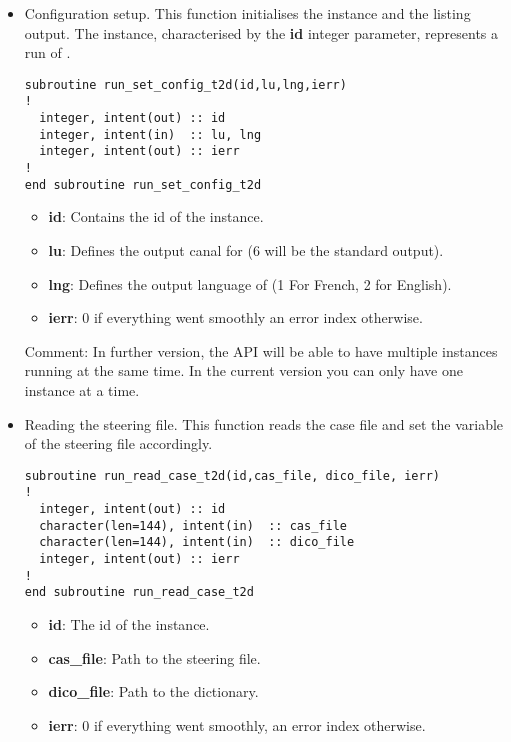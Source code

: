 \begin{itemize}
\item Configuration setup. This function initialises the instance and the
  listing output. The instance, characterised by the \textbf{id} integer parameter,
  represents a run of .

\begin{lstlisting}
subroutine run_set_config_t2d(id,lu,lng,ierr)
!
  integer, intent(out) :: id
  integer, intent(in)  :: lu, lng
  integer, intent(out) :: ierr
!
end subroutine run_set_config_t2d
\end{lstlisting}

\begin{itemize}
\item \textbf{id}: Contains the id of the instance.
\item \textbf{lu}: Defines the output canal for  (6 will be the
  standard output).
\item \textbf{lng}: Defines the output language of  (1 For French,
  2 for English).
\item \textbf{ierr}: 0 if everything went smoothly an error index otherwise.
\end{itemize}

\begin{CommentBlock}{Comment:}
\centering
In further version, the API will be able to have multiple instances running at
the same time. In the current version you can only have one instance at a time.
\end{CommentBlock}

\item Reading the  steering file. This function reads the case file and
  set the variable of the  steering file accordingly.

\begin{lstlisting}
subroutine run_read_case_t2d(id,cas_file, dico_file, ierr)
!
  integer, intent(out) :: id
  character(len=144), intent(in)  :: cas_file
  character(len=144), intent(in)  :: dico_file
  integer, intent(out) :: ierr
!
end subroutine run_read_case_t2d
\end{lstlisting}

\begin{itemize}
\item \textbf{id}: The id of the instance.
\item \textbf{cas\_file}: Path to the steering file.
\item \textbf{dico\_file}: Path to the  dictionary.
\item \textbf{ierr}: 0 if everything went smoothly, an error index otherwise.
\end{itemize}


\end{itemize}
